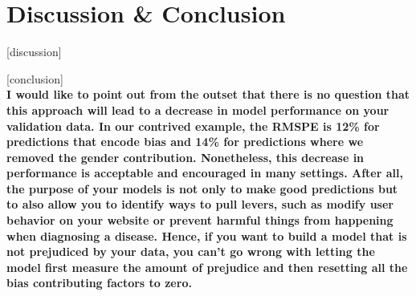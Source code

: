 \documentclass{sigchi}
\begin{document}
\section{Discussion \& Conclusion}
	[discussion]
	
	[conclusion] \\
	\textbf{I would like to point out from the outset that there is no question that this approach will lead to a decrease in model performance on your validation data. In our contrived example, the RMSPE is 12\% for predictions that encode bias and 14\% for predictions where we removed the gender contribution. Nonetheless, this decrease in performance is acceptable and encouraged in many settings. After all, the purpose of your models is not only to make good predictions but to also allow you to identify ways to pull levers, such as modify user behavior on your website or prevent harmful things from happening when diagnosing a disease. Hence, if you want to build a model that is not prejudiced by your data, you can’t go wrong with letting the model first measure the amount of prejudice and then resetting all the bias contributing factors to zero.}


\newpage
\balance{}


\end{document}
